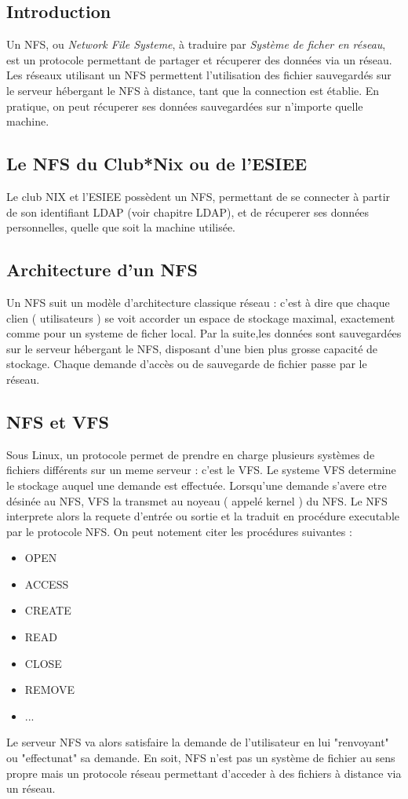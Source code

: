 \subsection{Introduction}

Un NFS, ou \textit{Network File Systeme}, à traduire par \textit{Système de ficher en réseau}, est un protocole permettant de partager et récuperer des données via un réseau. Les réseaux utilisant un NFS permettent l'utilisation des fichier sauvegardés sur le serveur hébergant le NFS à distance, tant que la connection est établie. En pratique, on peut récuperer ses données sauvegardées sur n'importe quelle machine.


\subsection{Le NFS du Club*Nix ou de l'ESIEE}

Le club NIX et l'ESIEE possèdent un NFS, permettant de se connecter à partir de son identifiant LDAP (voir chapitre LDAP), et de récuperer ses données personnelles, quelle que soit la machine utilisée.
\subsection{Architecture d'un NFS}
Un NFS suit un modèle d'architecture classique réseau : c'est à dire que chaque clien ( utilisateurs ) se voit accorder un espace de stockage maximal, exactement comme pour un systeme de ficher local. Par la suite,les données sont sauvegardées sur le serveur hébergant le NFS, disposant d'une bien plus grosse capacité de stockage. Chaque demande d'accès ou de sauvegarde de fichier passe par le réseau.


\subsection{NFS et VFS}
Sous Linux, un protocole permet de prendre en charge plusieurs systèmes de fichiers différents sur un meme serveur : c'est le VFS. Le systeme VFS determine le stockage auquel une demande est effectuée.
Lorsqu'une demande s'avere etre désinée au NFS, VFS la transmet au noyeau ( appelé kernel ) du NFS. Le NFS interprete alors la requete d'entrée ou sortie et la traduit en procédure executable par le protocole NFS. On peut notement citer les procédures suivantes :
\begin{itemize}
  \item OPEN
  \item ACCESS
  \item CREATE
  \item READ
  \item CLOSE
  \item REMOVE
  \item ...
\end{itemize}
Le serveur NFS va alors satisfaire la demande de l'utilisateur en lui "renvoyant" ou "effectunat" sa demande.
En soit, NFS n'est pas un système de fichier au sens propre mais un protocole réseau permettant d'acceder à des fichiers à distance via un réseau.


